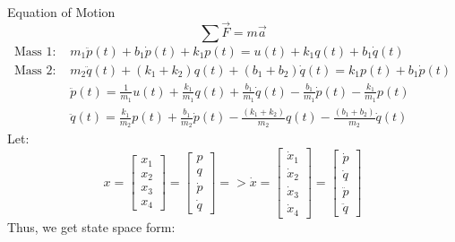Equation of Motion
\[
\sum \vec{F} = m\vec{a}
\]
\[
\begin{split}
	\text{Mass 1: }& m_1\ddot{p}(t) + b_1\dot{p}(t) + k_1p(t) = u(t) +k_1q(t)+b_1\dot{q}(t) \\
	\text{Mass 2: }& m_2\ddot{q}(t) + (k_1+k_2)q(t) + (b_1+b_2)\dot{q}(t) = k_1p(t)+b_1\dot{p}(t) \\
	&\ddot{p}(t)= \frac{1}{m_1}u(t) +\frac{k_1}{m_1}q(t)+\frac{b_1}{m_1}\dot{q}(t) - \frac{b_1}{m_1}\dot{p}(t) - \frac{k_1}{m_1}p(t)\\
	&\ddot{q}(t)= \frac{k_1}{m_2}p(t)+\frac{b_1}{m_2}\dot{p}(t) - \frac{(k_1+k_2)}{m_2}q(t) - \frac{(b_1+b_2)}{m_2}\dot{q}(t)
\end{split}
\]
Let:
\[
x = 
\begin{bmatrix}
	x_1 \\
	x_2 \\
	x_3 \\
	x_4 
\end{bmatrix}
= 
\begin{bmatrix}
	p       \\
	q       \\
	\dot{p} \\
	\dot{q} 
\end{bmatrix}
=>
\dot{x} = 
\begin{bmatrix}
	\dot{x}_1 \\
	\dot{x}_2 \\
	\dot{x}_3 \\
	\dot{x}_4 
\end{bmatrix}
= 
\begin{bmatrix}
	\dot{p}  \\
	\dot{q}  \\
	\ddot{p} \\
	\ddot{q} 
\end{bmatrix}
\]
Thus, we get state space form:
